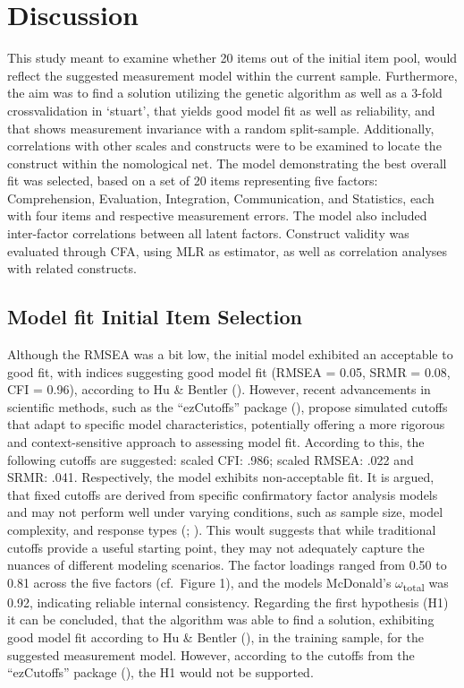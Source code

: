 \documentclass[
  12pt,
  a4paper,
  twoside]{article}
\begin{document}
\section{Discussion}\label{discussion}

This study meant to examine whether 20 items out of the initial item pool, would reflect the suggested measurement model within the current sample. Furthermore, the aim was to find a solution utilizing the genetic algorithm as well as a 3-fold crossvalidation in `stuart', that yields good model fit as well as reliability, and that shows measurement invariance with a random split-sample. Additionally, correlations with other scales and constructs were to be examined to locate the construct within the nomological net.
The model demonstrating the best overall fit was selected, based on a set of 20 items representing five factors: Comprehension, Evaluation, Integration, Communication, and Statistics, each with four items and respective measurement errors. The model also included inter-factor correlations between all latent factors.
Construct validity was evaluated through CFA, using MLR as estimator, as well as correlation analyses with related constructs.

\subsection{Model fit Initial Item Selection}\label{model-fit-initial-item-selection}

Although the RMSEA was a bit low, the initial model exhibited an acceptable to good fit, with indices suggesting good model fit (RMSEA = 0.05, SRMR = 0.08, CFI = 0.96), according to Hu \& Bentler ().
However, recent advancements in scientific methods, such as the ``ezCutoffs'' package (), propose simulated cutoffs that adapt to specific model characteristics, potentially offering a more rigorous and context-sensitive approach to assessing model fit.
According to this, the following cutoffs are suggested: scaled CFI: .986; scaled RMSEA: .022 and SRMR: .041.
Respectively, the model exhibits non-acceptable fit.
It is argued, that fixed cutoffs are derived from specific confirmatory factor analysis models and may not perform well under varying conditions, such as sample size, model complexity, and response types (; ).
This woult suggests that while traditional cutoffs provide a useful starting point, they may not adequately capture the nuances of different modeling scenarios.
The factor loadings ranged from 0.50 to 0.81 across the five factors (cf.~Figure 1), and the models McDonald's \(\omega\)\textsubscript{total} was 0.92, indicating reliable internal consistency.
Regarding the first hypothesis (H1) it can be concluded, that the algorithm was able to find a solution, exhibiting good model fit according to Hu \& Bentler (), in the training sample, for the suggested measurement model.
However, according to the cutoffs from the ``ezCutoffs'' package (), the H1 would not be supported.
\end{document}
